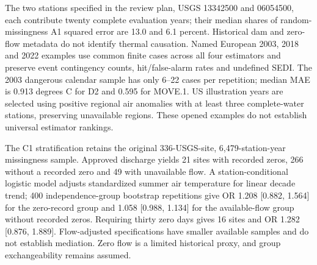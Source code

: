 \documentclass[draft]{agujournal2025}
\begin{document}
The two stations specified in the review plan, USGS 13342500 and 06054500, each contribute twenty complete evaluation years; their median shares of random-missingness A1 squared error are 13.0 and 6.1 percent. Historical dam and zero-flow metadata do not identify thermal causation. Named European 2003, 2018 and 2022 examples use common finite cases across all four estimators and preserve event contingency counts, hit/false-alarm rates and undefined SEDI. The 2003 dangerous calendar sample has only 6--22 cases per repetition; median MAE is 0.913 degrees C for D2 and 0.595 for MOVE.1. US illustration years are selected using positive regional air anomalies with at least three complete-water stations, preserving unavailable regions. These opened examples do not establish universal estimator rankings.

The C1 stratification retains the original 336-USGS-site, 6,479-station-year missingness sample. Approved discharge yields 21 sites with recorded zeros, 266 without a recorded zero and 49 with unavailable flow. A station-conditional logistic model adjusts standardized summer air temperature for linear decade trend; 400 independence-group bootstrap repetitions give OR 1.208 [0.882, 1.564] for the zero-record group and 1.058 [0.988, 1.134] for the available-flow group without recorded zeros. Requiring thirty zero days gives 16 sites and OR 1.282 [0.876, 1.889]. Flow-adjusted specifications have smaller available samples and do not establish mediation. Zero flow is a limited historical proxy, and group exchangeability remains assumed.










\clearpage

\clearpage

\clearpage

\clearpage

\clearpage

\clearpage

\clearpage








\end{document}
